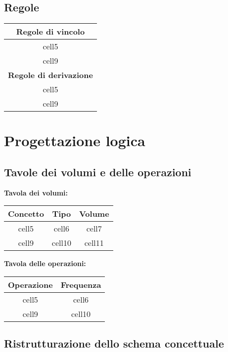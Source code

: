 \documentclass{article}
\begin{document}
\subsection{Regole}

\begin{tabular}{ |c| }
	\hline
	\textbf{Regole di vincolo}     \\
	\hline
	cell5                          \\
	\hline
	cell9                          \\
	\hline
	\textbf{Regole di derivazione} \\
	\hline
	cell5                          \\
	\hline
	cell9                          \\
	\hline
\end{tabular}

\section{Progettazione logica}

\subsection{Tavole dei volumi e delle operazioni}
\textbf{Tavola dei volumi:}

\begin{tabular}{ |c|c|c| }
	\hline
	\textbf{Concetto} & \textbf{Tipo} & \textbf{Volume} \\
	\hline
	cell5             & cell6         & cell7           \\
	\hline
	cell9             & cell10        & cell11          \\
	\hline
\end{tabular}

\textbf{Tavola delle operazioni:}

\begin{tabular}{ |c|c| }
	\hline
	\textbf{Operazione} & \textbf{Frequenza} \\
	\hline
	cell5               & cell6              \\
	\hline
	cell9               & cell10             \\
	\hline
\end{tabular}

\subsection{Ristrutturazione dello schema concettuale}
\end{document}
